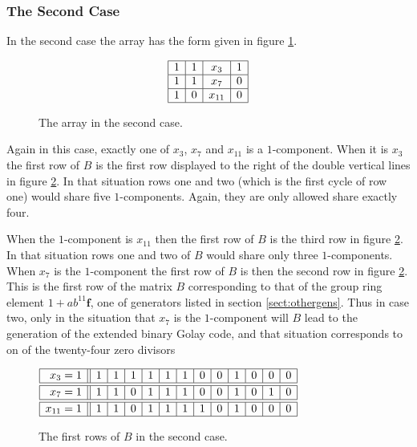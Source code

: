 \subsubsection{The Second Case}
In the second case the array has the form given in figure \ref{fig:arraycasetwo}.
\begin{figure}
\begin{center}
\[
\begin{array}{|c|c|c|c|}
\hline
1 & 1 & x_{ 3} & 1 \\
\hline
1 & 1 & x_{ 7} & 0 \\
\hline
1 & 0 & x_{11} & 0 \\
\hline
\end{array}
\]
\caption{The array in the second case.}
\label{fig:arraycasetwo}
\end{center}
\end{figure}
Again in this case, exactly one of $x_3$, $x_7$ and $x_{11}$ is a $1$-component.
When it is $x_3$ the first row of $B$ is the first row displayed to the right of the double vertical lines in figure \ref{fig:rowcasetwo}.
In that situation rows one and two (which is the first cycle of row one) would share five $1$-components.
Again, they are only allowed share exactly four.

When the $1$-component is $x_{11}$ then the first row of $B$ is the third row in figure \ref{fig:rowcasetwo}.
In that situation rows one and two of $B$ would share only three $1$-components.
When $x_7$ is the $1$-component the first row of $B$ is then the second row in figure \ref{fig:rowcasetwo}.
This is the first row of the matrix $B$ corresponding to that of the group ring element $1 + a b^{11} \mathbf{f}$, one of generators listed in section \ref{sect:othergens}.
Thus in case two, only in the situation that $x_7$ is the $1$-component will $B$ lead to the generation of the extended binary Golay code, and that situation corresponds to on of the twenty-four zero divisors
\begin{figure}
\begin{center}
$\begin{array}{|r||c|c|c|c|c|c|c|c|c|c|c|c|}
	\hline
	x_{ 3} = 1 & 1 & 1 & 1 & 1 & 1 & 1 & 0 & 0 & 1 & 0 & 0 & 0 \\
	\hline
	\hline
	x_{ 7} = 1 & 1 & 1 & 0 & 1 & 1 & 1 & 0 & 0 & 1 & 0 & 1 & 0 \\
	\hline
	\hline
	x_{11} = 1 & 1 & 1 & 0 & 1 & 1 & 1 & 1 & 0 & 1 & 0 & 0 & 0 \\
	\hline
\end{array}$
\caption{The first rows of $B$ in the second case.}
\label{fig:rowcasetwo}
\end{center}
\end{figure}

